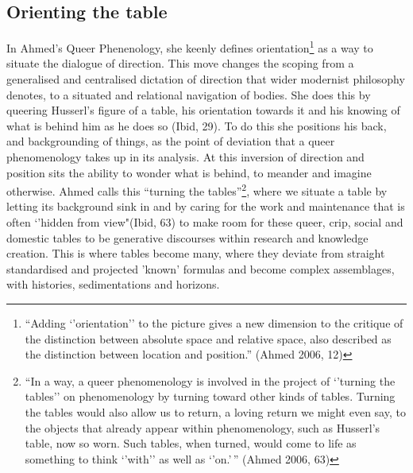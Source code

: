 \hypertarget{orienting-the-table}{%
\subsection{Orienting the table}\label{orienting-the-table}}

In Ahmed's Queer Phenenology, she keenly defines orientation\footnote{``Adding
  `'orientation'' to the picture gives a new dimension to the critique
  of the distinction between absolute space and relative space, also
  described as the distinction between location and position.'' (Ahmed
  2006, 12)} as a way to situate the dialogue of direction. This move
changes the scoping from a generalised and centralised dictation of
direction that wider modernist philosophy denotes, to a situated and
relational navigation of bodies. She does this by queering Husserl's
figure of a table, his orientation towards it and his knowing of what is
behind him as he does so (Ibid, 29). To do this she positions his back,
and backgrounding of things, as the point of deviation that a queer
phenomenology takes up in its analysis. At this inversion of direction
and position sits the ability to wonder what is behind, to meander and
imagine otherwise. Ahmed calls this ``turning the tables''\footnote{``In
  a way, a queer phenomenology is involved in the project of `'turning
  the tables'' on phenomenology by turning toward other kinds of tables.
  Turning the tables would also allow us to return, a loving return we
  might even say, to the objects that already appear within
  phenomenology, such as Husserl's table, now so worn. Such tables, when
  turned, would come to life as something to think `'with'' as well as
  `'on.'\,'' (Ahmed 2006, 63)}, where we situate a table by letting its
background sink in and by caring for the work and maintenance that is
often `'hidden from view"(Ibid, 63) to make room for these queer, crip,
social and domestic tables to be generative discourses within research
and knowledge creation. This is where tables become many, where they
deviate from straight standardised and projected 'known' formulas and
become complex assemblages, with histories, sedimentations and horizons.

